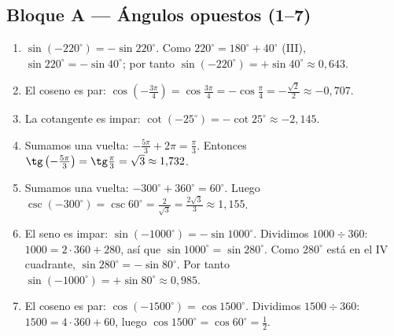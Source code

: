\documentclass[12pt, letterpaper]{article}
\providecommand{\sen}{\sin}
\begin{document}
\subsection*{Bloque A — Ángulos opuestos (1--7)}
\begin{enumerate}[leftmargin=*, label=\textbf{\arabic*.}]
  \item $\sen(-220^\circ)=-\sen 220^\circ$. Como $220^\circ=180^\circ+40^\circ$ (III), $\sen 220^\circ=-\sen 40^\circ$; por tanto $\sen(-220^\circ)=+\sen 40^\circ\approx 0{,}643$.
  \item El coseno es par: $\cos\left(-\frac{3\pi}{4}\right)=\cos\frac{3\pi}{4}=-\cos\frac{\pi}{4}=-\frac{\sqrt{2}}{2}\approx -0{,}707$.
  \item La cotangente es impar: $\cot(-25^\circ)=-\cot 25^\circ\approx -2{,}145$.
  \item Sumamos una vuelta: $-\frac{5\pi}{3}+2\pi=\frac{\pi}{3}$. Entonces $\tg\left(-\frac{5\pi}{3}\right)=\tg\frac{\pi}{3}=\sqrt{3}\approx 1{,}732$.
  \item Sumamos una vuelta: $-300^\circ+360^\circ=60^\circ$. Luego $\csc(-300^\circ)=\csc 60^\circ=\frac{2}{\sqrt{3}}=\frac{2\sqrt{3}}{3}\approx 1{,}155$.
  \item El seno es impar: $\sen(-1000^\circ)=-\sen 1000^\circ$. Dividimos $1000\div360$: $1000=2\cdot360+280$, así que $\sen 1000^\circ=\sen 280^\circ$. Como $280^\circ$ está en el IV cuadrante, $\sen 280^\circ=-\sen 80^\circ$. Por tanto $\sen(-1000^\circ)=+\sen 80^\circ\approx 0{,}985$.
  \item El coseno es par: $\cos(-1500^\circ)=\cos 1500^\circ$. Dividimos $1500\div360$: $1500=4\cdot360+60$, luego $\cos 1500^\circ=\cos 60^\circ=\frac12$.
\end{enumerate}
\end{document}
